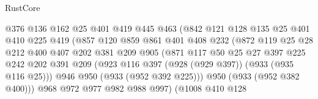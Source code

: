 \begin{lexlean}{RustCore}
\begin{coremodule}
                                @376
                                @136
                                @162
                                @25
                                @401
                                @419
                                @445
                                @463
                                (@842
                                  @121
                                  @128
                                  @135
                                  @25
                                  @401
                                  @410
                                  @225
                                  @419
                                  (@857
                                    @120
                                    @859
                                    @861
                                    @401
                                    @408
                                    @232
                                    (@872
                                      @119
                                      @25
                                      @28
                                      @212
                                      @400
                                      @407
                                      @202
                                      @381
                                      @209
                                      @905
                                      (@871
                                        @117
                                        @50
                                        @25
                                        @27
                                        @397
                                        @225
                                        @242
                                        @202
                                        @391
                                        @209
                                        (@923 @116 @397 (@928 (@929 @397)) (@933 (@935 @116 @25)))
                                        @946
                                        @950
                                        (@933 (@952 @392 @225)))
                                      @950
                                      (@933 (@952 @382 @400)))
                                    @968
                                    @972
                                    @977
                                    @982
                                    @988
                                    @997)
                                  (@1008
                                    @410
                                    @128

\end{coremodule}
\end{lexlean}
